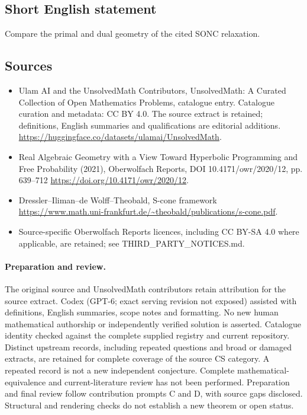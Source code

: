 \documentclass[11pt]{article}
\begin{document}
\subsection{Short English statement}
Compare the primal and dual geometry of the cited SONC relaxation.
\subsection{Sources}
\begin{itemize}
\item[\hypertarget{source:statement:1}{S1}] Ulam AI and the UnsolvedMath Contributors, UnsolvedMath: A Curated Collection of Open Mathematics Problems, catalogue entry. Catalogue curation and metadata: CC BY 4.0. The source extract is retained; definitions, English summaries and qualifications are editorial additions.
\url{https://huggingface.co/datasets/ulamai/UnsolvedMath}.
\item[\hypertarget{source:statement:2}{S2}] Real Algebraic Geometry with a View Toward Hyperbolic Programming and Free Probability (2021), Oberwolfach Reports, DOI 10.4171/owr/2020/12, pp. 639--712
\url{https://doi.org/10.4171/owr/2020/12}.
\item[\hypertarget{source:statement:3}{S3}] Dressler--Iliman--de Wolff--Theobald, S-cone framework
\url{https://www.math.uni-frankfurt.de/~theobald/publications/s-cone.pdf}.
\item Source-specific Oberwolfach Reports licences, including CC BY-SA 4.0 where applicable, are retained; see THIRD\_PARTY\_NOTICES.md.
\end{itemize}
\paragraph{Preparation and review.}
The original source and UnsolvedMath contributors retain attribution for the source extract. Codex (GPT-6; exact serving revision not exposed) assisted with definitions, English summaries, scope notes and formatting. No new human mathematical authorship or independently verified solution is asserted. Catalogue identity checked against the complete supplied registry and current repository. Distinct upstream records, including repeated questions and broad or damaged extracts, are retained for complete coverage of the source CS category. A repeated record is not a new independent conjecture. Complete mathematical-equivalence and current-literature review has not been performed. Preparation and final review follow contribution prompts C and D, with source gaps disclosed. Structural and rendering checks do not establish a new theorem or open status.
\label{end:statement}
\end{document}
